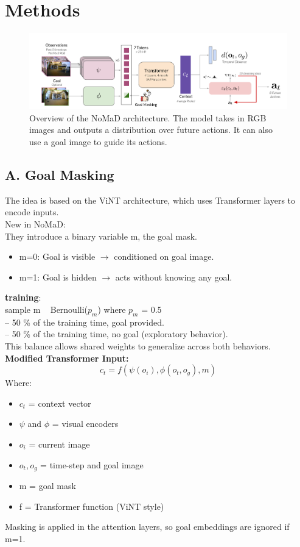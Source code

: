 \documentclass[12pt]{article}
\begin{document}
\section*{Methods}
\begin{figure}[H]
    \includegraphics[width=1\textwidth]{nomad_diagram.png}
    \caption{Overview of the NoMaD architecture. The model takes in RGB images and outputs a distribution over future actions. It can also use a goal image to guide its actions.}
    \label{fig:nomad_diagram}
\end{figure}
\subsection*{A. Goal Masking}
The idea is based on the ViNT architecture, which uses Transformer layers to encode inputs.\\
New in NoMaD:\\
They introduce a binary variable m, the goal mask.\\
\begin{itemize}
    \item m=0: Goal is visible $\to$ conditioned on goal image.
    \item m=1: Goal is hidden $\to$ acts without knowing any goal.
\end{itemize}
\textbf{training}:\\
sample m ~ Bernoulli($p_m$) where $p_m$ = 0.5\\
-- 50 \% of the training time, goal provided.\\
-- 50 \% of the training time, no goal (exploratory behavior).\\
This balance allows shared weights to generalize across both behaviors.\\

\noindent \textbf{Modified Transformer Input:}\\
\[ c_t = f(\psi(o_i), \phi(o_t, o_g), m) \]
Where:\\
\begin{itemize}
    \item $c_t$ = context vector
    \item $\psi$ and $\phi$ = visual encoders
    \item $o_i$ = current image
    \item $o_t, o_g$ = time-step and goal image
    \item m = goal mask
    \item f = Transformer function (ViNT style)
\end{itemize}
Masking is applied in the attention layers, so goal embeddings are ignored if m=1.\\
\end{document}
